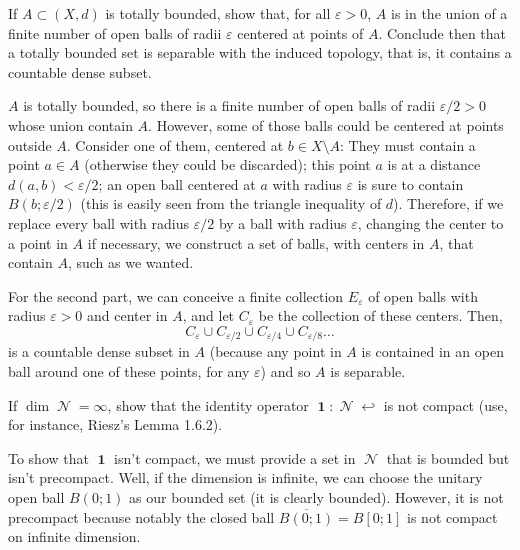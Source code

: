 \documentclass{article}
\theoremstyle{exercisestyle}
\newenvironment{exercise}[1]
  {\renewcommand\theinnerex{#1}\innerex}
  {\endinnerex}
\newcommand{\closure}[1]{\overline{ #1}}
\newcommand{\openball}[2]{B\left(#1;#2\right)}
\newcommand{\closedball}[2]{B\left[#1;#2\right]}
\DeclareMathOperator{\normed}{\mathcal{N}}
\DeclareMathOperator{\id}{\textbf{1}}
\begin{document}
\begin{exercise}{1.3.2}
    If $A \subset (X, d)$ is totally bounded, show that, for all $\varepsilon > 0$, $A$ is in the union of a finite number of open balls of radii $\varepsilon$ centered at points of $A$.
    Conclude then that a totally bounded set is separable with the induced topology, that is, it contains a countable dense subset.

    $A$ is totally bounded, so there is a finite number of open balls of radii $\varepsilon/2 > 0$ whose union contain $A$.
    However, some of those balls could be centered at points outside $A$.
    Consider one of them, centered at $b \in X\setminus A$: They must contain a point $a \in A$ (otherwise they could be discarded);
    this point $a$ is at a distance $d(a,b)<\varepsilon/2$;
    an open ball centered at $a$ with radius $\varepsilon$ is sure to contain $\openball{b}{\varepsilon/2}$ (this is easily seen from the triangle inequality of $d$).
    Therefore, if we replace every ball with radius $\varepsilon/2$ by a ball with radius $\varepsilon$, changing the center to a point in $A$ if necessary,
    we construct a set of balls, with centers in $A$, that contain $A$, such as we wanted.

    For the second part, we can conceive a finite collection $E_\varepsilon$ of open balls with radius $\varepsilon > 0$ and center in $A$,
    and let $C_\varepsilon$ be the collection of these centers. Then,
    $$ C_\varepsilon \cup C_{\varepsilon/2} \cup C_{\varepsilon/4} \cup C_{\varepsilon/8} \dots$$
    is a countable dense subset in $A$ (because any point in $A$ is contained in an open ball around one of these points, for any $\varepsilon$) and so $A$ is separable.


\end{exercise}

\begin{exercise}{1.3.6}
    If $\dim \normed = \infty$, show that the identity operator $\id : \normed \hookleftarrow$ is not compact (use, for instance, Riesz’s Lemma 1.6.2).

    To show that $\id$ isn't compact, we must provide a set in $\normed$ that is bounded but isn't precompact. Well, if the dimension is infinite, we can choose
    the unitary open ball $\openball{0}{1}$ as our bounded set (it is clearly bounded). However, it is not precompact because notably the closed ball
    $ \closure{\openball{0}{1}} = \closedball{0}{1}$ is not compact on infinite dimension.

\end{exercise}
\end{document}

